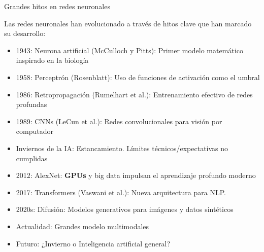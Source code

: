 \begin{frame}{Grandes hitos en redes neuronales}
\footnotesize{
Las redes neuronales han evolucionado a través de hitos clave que han marcado su desarrollo:

\begin{itemize}
    \item \alert{1943: Neurona artificial} (McCulloch y Pitts): Primer modelo matemático inspirado en la biología
    \item \alert{1958: Perceptrón} (Rosenblatt): Uso de funciones de activación como el umbral
    \item \alert{1986: Retropropagación} (Rumelhart et al.): Entrenamiento efectivo de redes profundas
    \item \alert{1989: CNNs} (LeCun et al.): Redes convolucionales para visión por computador
    \item \alert{Inviernos de la IA}: Estancamiento. Límites técnicos/expectativas no cumplidas
    \item \alert{2012: AlexNet}: \textbf{GPUs} y big data impulsan el aprendizaje profundo moderno
    \item \alert{2017: Transformers} (Vaswani et al.): Nueva arquitectura para NLP.
    \item \alert{2020s: Difusión}: Modelos generativos para imágenes y datos sintéticos
    \item \alert{Actualidad}: Grandes modelo multimodales
    \item \alert{Futuro}: ¿Invierno o Inteligencia artificial general?
\end{itemize}
}
\end{frame}

